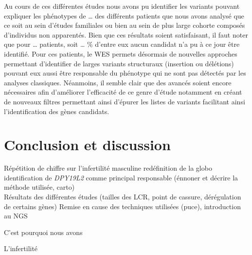 \documentclass[12pt,twoside]{reedthesis}
\theoremstyle{definition}
\theoremstyle{definition}
\theoremstyle{remark}
\begin{document}
  Au cours de ces différentes études nous avons pu identifier les variants
  pouvant expliquer les phénotypes de \ldots{} des différents patients que
  nous avons analysé que ce soit au sein d'études familiales ou bien au
  sein de plus large cohorte composés d'individus non apparentés. Bien que
  ces résultats soient satisfaisant, il faut noter que pour \ldots{}
  patients, soit \ldots{} \% d'entre eux aucun candidat n'a pu à ce jour
  être identifié. Pour ces patients, le WES permets désormais de nouvelles
  approches permettant d'identifier de larges variants structuraux
  (insertion ou délétions) pouvant eux aussi être responsable du phénotype
  qui ne sont pas détectés par les analyses classiques. Néanmoins, il
  semble clair que des avancés soient encore nécessaires afin d'améliorer
  l'efficacité de ce genre d'étude notamment en créant de nouveaux filtres
  permettant ainsi d'épurer les listes de variants facilitant ainsi
  l'identification des gènes candidats.
  
  \chapter*{Conclusion et discussion}\label{conclusion-et-discussion}
  
  Répétition de chiffre sur l'infertilité masculine redéfinition de la
  globo\\
  identification de \emph{DPY19L2} comme principal responsable (énnoner et
  décrire la méthode utilisée, carto)\\
  Résultats des différentes études (tailles des LCR, point de cassure,
  dérégulation de certains gènes) Remise en cause des techniques utilisées
  (puce), introduction au NGS
  
  C'est pourquoi nous avons
  
  \newpage
  
  L'infertilité
  
\end{document}
